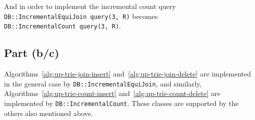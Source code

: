 And in order to implement the incremental count query \texttt{DB::IncrementalEquiJoin~query(3,~R)} becomes \texttt{DB::IncrementalCount~query(3,~R)}.

\subsection{Part (b/c)}\label{sec:q-2-bc}

Algorithms~\ref{alg:up-trie-join-insert} and~\ref{alg:up-trie-join-delete} are implemented in the general case by \texttt{DB::IncrementalEquiJoin}, and similarly, Algorithms~\ref{alg:up-trie-count-insert} and~\ref{alg:up-trie-count-delete} are implemented by \texttt{DB::IncrementalCount}. These classes are supported by the others also mentioned above.
